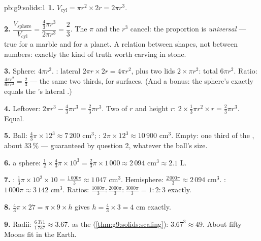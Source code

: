 \begin{solution}{pb:g9:solids:1}
\textbf{1.} $V_{\text{cyl}} = \pi r^2 \times 2r = 2\pi r^3$.

\textbf{2.} $\dfrac{V_{\text{sphere}}}{V_{\text{cyl}}}
= \dfrac{\frac43 \pi r^3}{2 \pi r^3} = \dfrac23$. The $\pi$ and
the $r^3$ cancel: the proportion is \emph{universal} --- true
for a marble and for a planet. A relation between shapes, not
between numbers: exactly the kind of truth worth carving in
stone.

\textbf{3.} Sphere: $4\pi r^2$. : lateral
$2\pi r \times 2r = 4\pi r^2$, plus two lids
$2 \times \pi r^2$: total $6\pi r^2$. Ratio:
$\frac{4\pi r^2}{6\pi r^2} = \frac23$ --- the same two thirds,
for surfaces. (And a bonus: the sphere's  exactly equals
the 's lateral .)

\textbf{4.} Leftover: $2\pi r^3 - \frac43\pi r^3 =
\frac23 \pi r^3$. Two  of  $r$ and height $r$:
$2 \times \frac13 \pi r^2 \times r = \frac23 \pi r^3$. Equal.

\textbf{5.} Ball: $\frac43 \pi \times 12^3 \approx 7\,200$
cm$^3$; : $2\pi \times 12^3 \approx 10\,900$ cm$^3$. Empty:
one third of the , about $33\,\%$ --- guaranteed by
question 2, whatever the ball's size.

\textbf{6.}  a sphere:
$\frac12 \times \frac43 \pi \times 10^3 = \frac23 \pi \times
1\,000 \approx 2\,094$ cm$^3 \approx 2.1$ L.

\textbf{7.} : $\frac13 \pi \times 10^2 \times 10 =
\frac{1\,000\pi}{3} \approx 1\,047$ cm$^3$. Hemisphere:
$\frac{2\,000\pi}{3} \approx 2\,094$ cm$^3$. :
$1\,000\pi \approx 3\,142$ cm$^3$. Ratios:
$\frac{1000\pi}{3} : \frac{2000\pi}{3} : \frac{3000\pi}{3}
= 1 : 2 : 3$ exactly.

\textbf{8.} $\frac43 \pi \times 27 = \pi \times 9 \times h$
gives $h = \frac43 \times 3 = 4$ cm exactly.

\textbf{9.} Radii: $\frac{6\,371}{1\,737} \approx 3.67$.
  as the  (\cref{thm:g9:solids:scaling}):
$3.67^3 \approx 49$. About fifty Moons fit in the Earth.


\end{solution}
